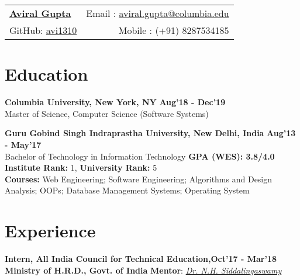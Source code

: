 \documentclass[margin,line]{res}
\begin{document}
\begin{tabular*}{\textwidth}{l@{\extracolsep{\fill}}r}
  \textbf{\href{https://www.linkedin.com/in/aviral13/}{\Large Aviral Gupta}} & Email : \href{mailto:aviral.gupta@columbia.edu}{aviral.gupta@columbia.edu}\\
  GitHub: {\href{https://github.com/avi1310}{avi1310}} & Mobile : (+91) 8287534185 \\
\end{tabular*}

\begin{resume}


\section{\sc Education}
{\bf Columbia University, New York, NY} \hfill {\bf Aug'18 - Dec'19}\\
Master of Science, Computer Science (Software Systems) %


{\bf Guru Gobind Singh Indraprastha University, New Delhi, India} \hfill {\bf Aug'13 - May'17}\\
Bachelor of Technology in Information Technology \hfill {\bf GPA (WES): 3.8/4.0}\\
{\bf Institute Rank: }1, {\bf University Rank: }5\\
{\bf Courses:} Web Engineering; Software Engineering; Algorithms and Design Analysis; OOPs; Database Management Systems; Operating System 

\section{\sc Experience}
{\bf Intern, All India Council for Technical Education,}\hfill {\bf Oct'17 - Mar'18}\\  
{\bf Ministry of H.R.D., Govt. of India} \hfill {\bf Mentor}: {\href{https://www.aicte-india.org/leadership/dr-nh-siddalingaswamy}{\it Dr. N.H. Siddalingaswamy}}


\end{resume}
\end{document}
